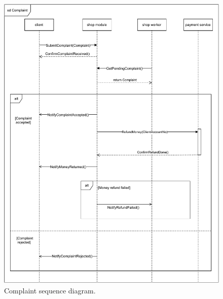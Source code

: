 \documentclass[../main.tex]{subfiles}
\begin{document}
\begin{figure}
\caption{Complaint sequence diagram.}
\vspace{5mm}
\centering
\includegraphics[width=\textwidth]
{diagrams/sequence-diagrams/Complaint.pdf}
\end{figure}
\end{document}
